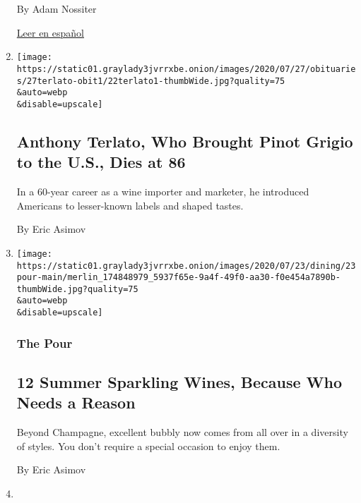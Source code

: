 \begin{enumerate}
  By Adam Nossiter

  \href{https://www.nytimes3xbfgragh.onion/es/2020/07/28/espanol/mundo/vino-blanco-alsacia-coronavirus.html}{Leer
  en español}
\item
  \href{/2020/07/23/dining/drinks/anthony-terlato-dead.html}{}

  \texttt{[image: https://static01.graylady3jvrrxbe.onion/images/2020/07/27/obituaries/27terlato-obit1/22terlato1-thumbWide.jpg?quality=75\\\&auto=webp\\\&disable=upscale]}

  \hypertarget{anthony-terlato-who-brought-pinot-grigio-to-the-us-dies-at-86}{%
  \subsection{Anthony Terlato, Who Brought Pinot Grigio to the U.S.,
  Dies at
  86}\label{anthony-terlato-who-brought-pinot-grigio-to-the-us-dies-at-86}}

  In a 60-year career as a wine importer and marketer, he introduced
  Americans to lesser-known labels and shaped tastes.

  By Eric Asimov
\item
  \href{/2020/07/23/dining/drinks/best-sparkling-wines.html}{}

  \texttt{[image: https://static01.graylady3jvrrxbe.onion/images/2020/07/23/dining/23pour-main/merlin\_174848979\_5937f65e-9a4f-49f0-aa30-f0e454a7890b-thumbWide.jpg?quality=75\\\&auto=webp\\\&disable=upscale]}

  \hypertarget{the-pour-3}{%
  \subsubsection{The Pour}\label{the-pour-3}}

  \hypertarget{12-summer-sparkling-wines-because-who-needs-a-reason}{%
  \subsection{12 Summer Sparkling Wines, Because Who Needs a
  Reason}\label{12-summer-sparkling-wines-because-who-needs-a-reason}}

  Beyond Champagne, excellent bubbly now comes from all over in a
  diversity of styles. You don't require a special occasion to enjoy
  them.

  By Eric Asimov
\item
  \href{/2020/07/20/dining/drinks/wine-vineyard-viticulture-farming.html}{}


\end{enumerate}
